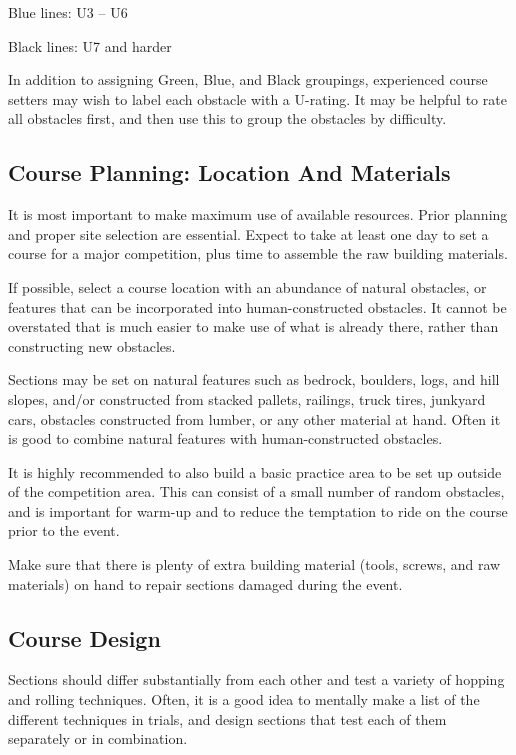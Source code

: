 Blue lines: U3 – U6 

Black lines: U7 and harder

In addition to assigning Green, Blue, and Black groupings, experienced course setters may wish to label each obstacle with a U-rating.
It may be helpful to rate all obstacles first, and then use this to group the obstacles by difficulty.

\subsection{Course Planning: Location And Materials}
It is most important to make maximum use of available resources. 
Prior planning and proper site selection are essential.
Expect to take at least one day to set a course for a major competition, plus time to assemble the raw building materials.

If possible, select a course location with an abundance of natural obstacles, or features that can be incorporated into human-constructed obstacles. 
It cannot be overstated that is much easier to make use of what is already there, rather than constructing new obstacles.

Sections may be set on natural features such as bedrock, boulders, logs, and hill slopes, and/or constructed from stacked pallets, railings, truck tires, junkyard cars, obstacles constructed from lumber, or any other material at hand. 
Often it is good to combine natural features with human-constructed obstacles.

It is highly recommended to also build a basic practice area to be set up outside of the competition area. 
This can consist of a small number of random obstacles, and is important for warm-up and to reduce the temptation to ride on the course prior to the event.

Make sure that there is plenty of extra building material (tools, screws, and raw materials) on hand to repair sections damaged during the event.

\subsection{Course Design}
Sections should differ substantially from each other and test a variety of hopping and rolling techniques. 
Often, it is a good idea to mentally make a list of the different techniques in trials, and design sections that test each of them separately or in combination.

